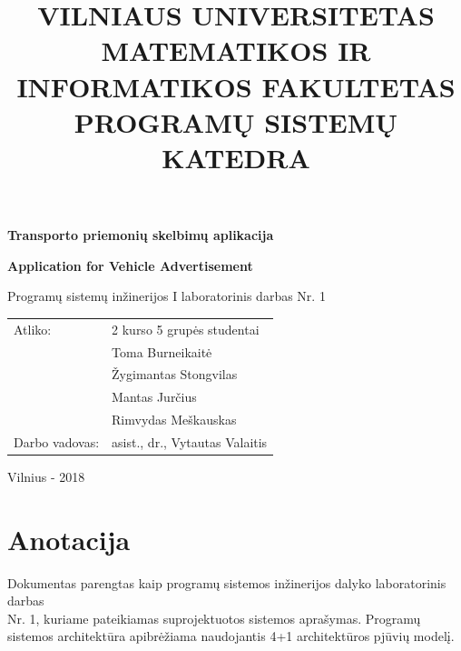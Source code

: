 \documentclass[12pt]{article}
\title{VILNIAUS UNIVERSITETAS \\
MATEMATIKOS IR INFORMATIKOS FAKULTETAS \\
PROGRAMŲ SISTEMŲ KATEDRA}
\author{}
\date{}
\begin{document}
	\clearpage
	\maketitle
	\thispagestyle{empty}

	\bigbreak
	\bigbreak
	\bigbreak
	\bigbreak

	\begin{center}
		\begin{Large}
			\textbf{Transporto priemonių skelbimų aplikacija} \\
		\end{Large}
		\begin{large}
			\textbf{Application for Vehicle Advertisement} \\
		\end{large}
		Programų sistemų inžinerijos I laboratorinis darbas Nr. 1 \\

		\bigbreak
		\bigbreak
		\bigbreak
		\bigbreak
		\bigbreak
		\bigbreak
		\bigbreak
		\bigbreak
		\bigbreak

		\begin{tabular}{ll}
			Atliko:        & 2 kurso 5 grupės studentai \\
		               	   & Toma Burneikaitė \\
		               	   & Žygimantas Stongvilas \\
		                   & Mantas Jurčius \\
		                   & Rimvydas Meškauskas \\
			Darbo vadovas: & asist., dr., Vytautas Valaitis
		\end{tabular}

		\bigbreak
		\bigbreak
		\bigbreak
		\bigbreak
		\bigbreak
		\bigbreak
		\bigbreak
		\bigbreak
		\bigbreak

		Vilnius - 2018
	\end{center}
	\pagebreak
	
	\section*{Anotacija}
	\begin{indent}
	Dokumentas parengtas kaip programų sistemos inžinerijos dalyko laboratorinis darbas\\Nr. 1, kuriame pateikiamas suprojektuotos sistemos aprašymas. Programų sistemos architektūra apibrėžiama naudojantis 4+1 architektūros pjūvių modelį.
	\end{indent}
	\pagebreak
\end{document}
